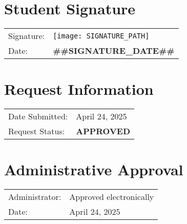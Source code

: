 \documentclass[12pt]{article}
\begin{document}
\section*{Student Signature}
\begin{tabular}{ll}
Signature: & \texttt{[image: SIGNATURE\_PATH]} \\
Date: & \textbf{##SIGNATURE_DATE##} \\
\end{tabular}

\vspace{0.5cm}

\section*{Request Information}
\begin{tabular}{ll}
Date Submitted: & April 24, 2025 \\
Request Status: & \textbf{APPROVED} \\
\end{tabular}

\section*{Administrative Approval}
            \begin{tabular}{l l}
            Administrator: & Approved electronically \\
            Date: & April 24, 2025 \\
            \end{tabular}

\label{LastPage}
\end{document}
